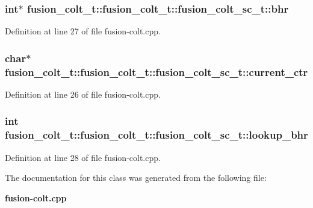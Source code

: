 \subsubsection[{bhr}]{\setlength{\rightskip}{0pt plus 5cm}int$\ast$ fusion\_\-colt\_\-t::fusion\_\-colt\_\-t::fusion\_\-colt\_\-sc\_\-t::bhr}\label{classfusion__colt__t_1_1fusion__colt__sc__t_f113cf2733ef1916ba94154f79780358}




Definition at line 27 of file fusion-colt.cpp.
\subsubsection[{current\_\-ctr}]{\setlength{\rightskip}{0pt plus 5cm}char$\ast$ fusion\_\-colt\_\-t::fusion\_\-colt\_\-t::fusion\_\-colt\_\-sc\_\-t::current\_\-ctr}\label{classfusion__colt__t_1_1fusion__colt__sc__t_149fd7d6c7ca44972b833e7c8a60b055}




Definition at line 26 of file fusion-colt.cpp.
\subsubsection[{lookup\_\-bhr}]{\setlength{\rightskip}{0pt plus 5cm}int fusion\_\-colt\_\-t::fusion\_\-colt\_\-t::fusion\_\-colt\_\-sc\_\-t::lookup\_\-bhr}\label{classfusion__colt__t_1_1fusion__colt__sc__t_79cedeb505399ef592b73a89e4dfa065}




Definition at line 28 of file fusion-colt.cpp.

The documentation for this class was generated from the following file:\begin{CompactItemize}
\item 
{\bf fusion-colt.cpp}\end{CompactItemize}
